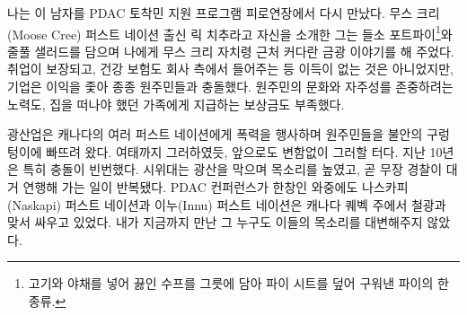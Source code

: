 \documentclass{translation}
\begin{document}
나는 이 남자를 PDAC 토착민 지원 프로그램 피로연장에서 다시 만났다.
무스 크리(Moose Cree) 퍼스트 네이션 출신 릭 치추라고 자신을 소개한 그는 들소 포트파이\footnote{고기와 야채를 넣어 끓인 수프를 그릇에 담아 파이 시트를 덮어 구워낸 파이의 한 종류.}와 줄풀 샐러드를 담으며 나에게 무스 크리 자치령 근처 커다란 금광 이야기를 해 주었다.
취업이 보장되고, 건강 보험도 회사 측에서 들어주는 등 이득이 없는 것은 아니었지만, 기업은 이익을 좇아 종종 원주민들과 충돌했다.
원주민의 문화와 자주성를 존중하려는 노력도, 집을 떠나야 했던 가족에게 지급하는 보상금도 부족했다.
%

광산업은 캐나다의 여러 퍼스트 네이션에게 폭력을 행사하며 원주민들을 불안의 구렁텅이에 빠뜨려 왔다.
여태까지 그러하였듯, 앞으로도 변함없이 그러할 터다.
지난 10년은 특히 충돌이 빈번했다.
시위대는 광산을 막으며 목소리를 높였고, 곧 무장 경찰이 대거 연행해 가는 일이 반복됐다.
PDAC 컨퍼런스가 한창인 와중에도 나스카피(Naskapi) 퍼스트 네이션과 이누(Innu) 퍼스트 네이션은 캐나다 퀘벡 주에서 철광과 맞서 싸우고 있었다.
내가 지금까지 만난 그 누구도 이들의 목소리를 대변해주지 않았다.
%
\end{document}
